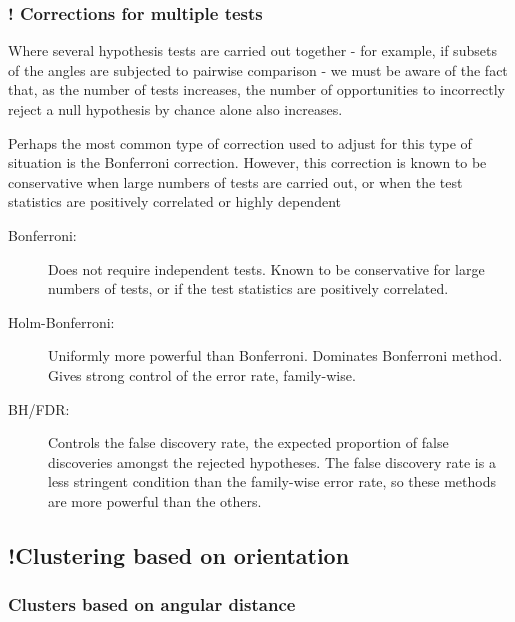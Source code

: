 \documentclass[../../ArchStats.tex]{subfiles}
\begin{document}
\subsubsection{! Corrections for multiple tests}

Where several hypothesis tests are carried out together - for example, if subsets of the angles are subjected to pairwise comparison - we must be aware of the fact that, as the number of tests increases, the number of opportunities to incorrectly reject a null hypothesis by chance alone also increases.

Perhaps the most common type of correction used to adjust for this type of situation is the Bonferroni correction. However, this correction is known to be conservative when large numbers of tests are carried out, or when the test statistics are positively correlated or highly dependent 


\begin{description}

\item[Bonferroni: ] Does not require independent tests. Known to be conservative for large numbers of tests, or if the test statistics are positively correlated.

\item[Holm-Bonferroni: ] Uniformly more powerful than Bonferroni. Dominates Bonferroni method. Gives strong control of the error rate, family-wise. \cite{Holm1979}

\item[BH/FDR: ] Controls the false discovery rate, the expected proportion of false discoveries amongst the rejected hypotheses. The false discovery rate is a less stringent condition than the family-wise error rate, so these methods are more powerful than the others. \cite{BH1995}

\end{description}

\subsection{!Clustering based on orientation}

\subsubsection{Clusters based on angular distance}
\end{document}
